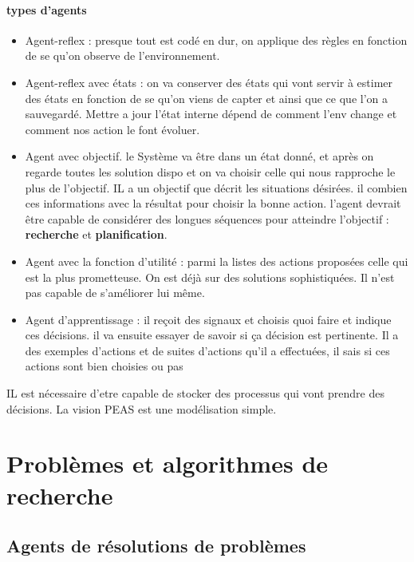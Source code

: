 \documentclass{article}
\begin{document}
\paragraph{types d'agents}
\begin{itemize}
\item Agent-reflex : presque tout est codé en dur, on applique des règles en fonction de se qu'on observe de l'environnement.
\item Agent-reflex avec états : on va conserver des états qui vont servir à estimer des états en fonction de se qu'on viens de capter et ainsi que ce que l'on a sauvegardé. Mettre a jour l'état interne dépend de comment l'env change et comment nos action le font évoluer.
\item Agent avec objectif. le Système va être dans un état donné, et après on regarde toutes les solution dispo et on va choisir celle qui nous rapproche le plus de l'objectif. IL a un objectif que décrit les situations désirées. il combien ces informations avec la résultat pour choisir la bonne action. l'agent devrait être capable de considérer des longues séquences pour atteindre l'objectif : \textbf{recherche} et \textbf{planification}.
\item Agent avec la fonction d'utilité : parmi la listes des actions proposées celle qui est la plus prometteuse. On est déjà sur des solutions sophistiquées. Il n'est pas capable de s'améliorer lui même.
\item Agent d'apprentissage : il reçoit des signaux et choisis quoi faire et indique ces décisions. il va ensuite essayer de savoir si ça décision est pertinente. Il a des exemples d’actions et de suites d'actions qu'il a effectuées, il sais si ces actions sont bien choisies ou pas
\end{itemize}
IL est nécessaire d'etre capable de stocker des processus qui vont prendre des décisions. La vision PEAS est une modélisation simple. 

\section{Problèmes et algorithmes de recherche}
\subsection{Agents de résolutions de problèmes}
\end{document}
